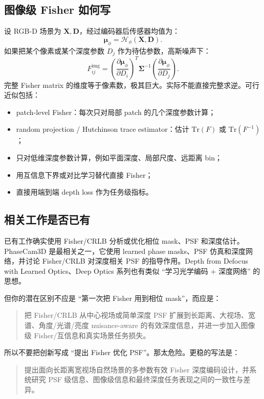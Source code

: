 \documentclass[11pt,a4paper,fontset=none]{ctexart}
\begin{document}
\subsection{图像级 Fisher 如何写}

设 RGB-D 场景为 $\bm X,\bm D$，经过编码器后传感器均值为：
\begin{equation}
  \bm\mu_\phi=\mathcal H_\phi(\bm X,\bm D).
\end{equation}
如果把某个像素或某个深度参数 $D_j$ 作为待估参数，高斯噪声下：
\begin{equation}
  F_{ij}^{\mathrm{img}}
  =
  \left(
  \frac{\partial \bm\mu_\phi}{\partial D_i}
  \right)^T
  \bm\Sigma^{-1}
  \left(
  \frac{\partial \bm\mu_\phi}{\partial D_j}
  \right).
\end{equation}
完整 Fisher matrix 的维度等于像素数，极其巨大。实际不能直接完整求逆。可行近似包括：
\begin{itemize}
  \item patch-level Fisher：每次只对局部 patch 的几个深度参数计算；
  \item random projection / Hutchinson trace estimator：估计 $\mathrm{Tr}(F)$ 或 $\mathrm{Tr}(F^{-1})$；
  \item 只对低维深度参数计算，例如平面深度、局部尺度、远距离 bin；
  \item 用互信息下界或对比学习替代直接 Fisher；
  \item 直接用端到端 depth loss 作为任务级指标。
\end{itemize}

\subsection{相关工作是否已有}

已有工作确实使用 Fisher/CRLB 分析或优化相位 mask、PSF 和深度估计。PhaseCam3D 是最相关之一，它使用 learned phase masks、PSF 仿真和深度网络，并讨论 Fisher/CRLB 对深度相关 PSF 的指导作用。Depth from Defocus with Learned Optics、Deep Optics 系列也有类似 ``学习光学编码 + 深度网络'' 的思想。

但你的潜在区别不应是 ``第一次把 Fisher 用到相位 mask''，而应是：
\begin{quote}
把 Fisher/CRLB 从中心视场或简单深度 PSF 扩展到长距离、大视场、宽谱、角度/光谱/亮度 nuisance-aware 的有效深度信息，并进一步加入图像级 Fisher/互信息和真实场景任务损失。
\end{quote}

所以不要把创新写成 ``提出 Fisher 优化 PSF''。那太危险。更稳的写法是：
\begin{quote}
提出面向长距离宽视场自然场景的多参数有效 Fisher 深度编码设计，并系统研究 PSF 级信息、图像级信息和最终深度任务表现之间的一致性与差异。
\end{quote}
\end{document}
